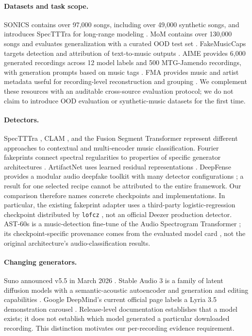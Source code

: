 \documentclass[10pt,a4paper]{article}
\begin{document}
\paragraph{Datasets and task scope.}
SONICS contains over 97,000 songs, including over 49,000 synthetic songs, and
introduces SpecTTTra for long-range modeling \citep{sonics}. MoM contains over
130,000 songs and evaluates generalization with a curated OOD test set
\citep{mom}. FakeMusicCaps targets detection and attribution of text-to-music
outputs \citep{fakemusiccaps}. AIME provides 6,000 generated recordings across
12 model labels and 500 MTG-Jamendo recordings, with generation prompts based on
music tags \citep{aime}. FMA provides music and artist metadata useful for
recording-level reconstruction and grouping \citep{fma}. We complement these
resources with an auditable cross-source evaluation protocol; we do not claim
to introduce OOD evaluation or synthetic-music datasets for the first time.

\paragraph{Detectors.}
SpecTTTra \citep{sonics}, CLAM \citep{mom}, and the Fusion Segment Transformer
\citep{fst} represent different approaches to contextual and multi-encoder music
classification. Fourier fakeprints connect spectral regularities to properties
of specific generator architectures \citep{fakeprint}. ArtifactNet uses learned
residual representations \citep{artifactnet}. DeepFense provides a modular audio
deepfake toolkit with many detector configurations \citep{deepfense}; a result
for one selected recipe cannot be attributed to the entire framework.
Our comparison therefore names concrete checkpoints and implementations. In
particular, the existing fakeprint adapter uses a third-party logistic-regression
checkpoint distributed by \texttt{lofcz} \citep{lofcz}, not an official Deezer
production detector. AST-60s is a music-detection fine-tune of the Audio
Spectrogram Transformer \citep{ast}; its checkpoint-specific provenance comes
from the evaluated model card \citep{ast60}, not the original architecture's
audio-classification results.

\paragraph{Changing generators.}
Suno announced v5.5 in March 2026 \citep{suno55}. Stable Audio 3 is a family of
latent diffusion models with a semantic-acoustic autoencoder and generation and
editing capabilities \citep{stableaudio3}. Google DeepMind's current official
page labels a Lyria 3.5 demonstration carousel \citep{lyria35}. Release-level
documentation establishes that a model exists; it does not establish which
model generated a particular downloaded recording. This distinction motivates
our per-recording evidence requirement.
\end{document}
